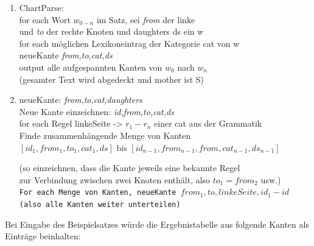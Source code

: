 \documentclass[12pt]{report}
\begin{document}
\begin{enumerate} \tt
\item 
ChartParse: \\
for each Wort $w_{0-n}$ im Satz, sei \textit{from} der linke \\
und \textit{to} der rechte Knoten und daughters ds ein w \\
\hspace*{.2cm} for each möglichen Lexikoneintrag der Kategorie cat von w \\
\hspace*{.4cm} neueKante \textit{from,to,cat,ds} \\
output alle aufgespannten Kanten von $w_{0}$ nach $w_{n}$ \\ \rm(gesamter Text wird abgedeckt und mother ist S)\tt
\item 
neueKante: \textit{from,to,cat,daughters} \\
Neue Kante einzeichnen: \textit{id,from,to,cat,ds} \\
for each Regel linkeSeite -> $r_{1}-r_{n}$ einer cat aus der Grammatik \\
\hspace*{.2cm} Finde zusammenhängende Menge von Kanten \\
\hspace*{.2cm} $[id_{1},from_{1},to_{1},cat_{1},ds]$ bis $[id_{n-1},from_{n-1},from,cat_{n-1},ds_{n-1}]$ 

\rm(so einzeichnen, dass die Kante jeweils  eine bekannte Regel \\
zur Verbindung zwischen zwei Knoten enthält, also $to_{1}=from_{2}$ usw.)\tt \\
\hspace*{.2cm} For each Menge von Kanten, neueKante $from_{1},to,linkeSeite,id_{1}-id$ \rm(also alle Kanten weiter unterteilen)
\end{enumerate}
Bei Eingabe des Beispielsatzes würde die Ergebnistabelle aus \cite{cop04} folgende Kanten als Einträge beinhalten:
\end{document}
